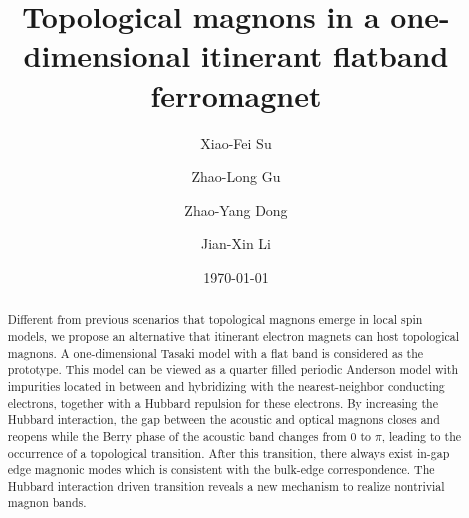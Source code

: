 \documentclass[amsmath,superscriptaddress,showpacs,aps,prb,twocolumn]{revtex4-1}
\begin{document}
\title{Topological magnons in a one-dimensional itinerant flatband ferromagnet}
\author{Xiao-Fei Su}
\author{Zhao-Long Gu}
\author{Zhao-Yang Dong}
\author{Jian-Xin Li}
\date{\today}

\begin{abstract}

\par Different from previous scenarios that topological magnons emerge in local spin models, we propose an alternative that itinerant electron magnets can host topological magnons. A one-dimensional Tasaki model with a flat band is considered as the prototype. This model can be viewed as a quarter filled periodic Anderson model with impurities located in between and hybridizing with the nearest-neighbor conducting electrons, together with a Hubbard repulsion for these electrons. By increasing the Hubbard interaction, the gap between the acoustic and optical magnons closes and reopens while the Berry phase of the acoustic band changes from 0 to $\pi$, leading to the occurrence of a topological transition. After this transition, there always exist in-gap edge magnonic modes which is consistent with the bulk-edge correspondence. The Hubbard interaction driven transition reveals a new mechanism to realize nontrivial magnon bands.

\end{abstract}

\maketitle
\end{document}
